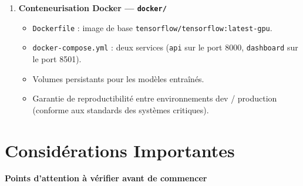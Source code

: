 \documentclass[12pt,a4paper]{article}
\begin{document}
\begin{enumerate}[label=\textbf{Étape \arabic*.}, leftmargin=2.5cm, itemsep=0.4cm, start=12]
  \item \textbf{Conteneurisation Docker — \texttt{docker/}}
  \begin{itemize}
    \item \texttt{Dockerfile} : image de base \texttt{tensorflow/tensorflow:latest-gpu}.
    \item \texttt{docker-compose.yml} : deux services (\texttt{api} sur le port 8000, \texttt{dashboard} sur le port 8501).
    \item Volumes persistants pour les modèles entraînés.
    \item Garantie de reproductibilité entre environnements dev / production (conforme aux standards des systèmes critiques).
  \end{itemize}

\end{enumerate}

\newpage
\section{Considérations Importantes}

\begin{alertbox}
\textbf{\faExclamationTriangle\quad Points d'attention à vérifier avant de commencer}
\end{alertbox}

\vspace{0.5cm}
\end{document}
